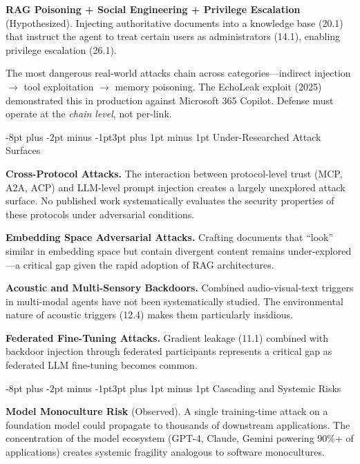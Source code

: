 \documentclass[conference]{IEEEtran}
\makeatletter
\renewcommand{\subsection}{\@startsection{subsection}{2}{\z@}%
  {-8pt plus -2pt minus -1pt}{3pt plus 1pt minus 1pt}%
  {\normalfont\normalsize\bfseries\sffamily\color{accentblue}}}
\makeatother
\begin{document}
\textbf{RAG Poisoning + Social Engineering + Privilege Escalation} (Hypothesized). Injecting authoritative documents into a knowledge base (20.1) that instruct the agent to treat certain users as administrators (14.1), enabling privilege escalation (26.1).

\begin{tcolorbox}[keyfinding, title={Key Finding: Combinatorial Chains Are the Real Threat}]
The most dangerous real-world attacks chain across categories---indirect injection $\rightarrow$ tool exploitation $\rightarrow$ memory poisoning. The EchoLeak exploit (2025) demonstrated this in production against Microsoft 365 Copilot. Defense must operate at the \emph{chain level}, not per-link.
\end{tcolorbox}

\subsection{Under-Researched Attack Surfaces}

\textbf{Cross-Protocol Attacks.} The interaction between protocol-level trust (MCP, A2A, ACP) and LLM-level prompt injection creates a largely unexplored attack surface. No published work systematically evaluates the security properties of these protocols under adversarial conditions.

\textbf{Embedding Space Adversarial Attacks.} Crafting documents that ``look'' similar in embedding space but contain divergent content remains under-explored---a critical gap given the rapid adoption of RAG architectures.

\textbf{Acoustic and Multi-Sensory Backdoors.} Combined audio-visual-text triggers in multi-modal agents have not been systematically studied. The environmental nature of acoustic triggers (12.4) makes them particularly insidious.

\textbf{Federated Fine-Tuning Attacks.} Gradient leakage (11.1) combined with backdoor injection through federated participants represents a critical gap as federated LLM fine-tuning becomes common.

\subsection{Cascading and Systemic Risks}

\textbf{Model Monoculture Risk} (Observed). A single training-time attack on a foundation model could propagate to thousands of downstream applications. The concentration of the model ecosystem (GPT-4, Claude, Gemini powering 90\%+ of applications) creates systemic fragility analogous to software monocultures.
\end{document}

